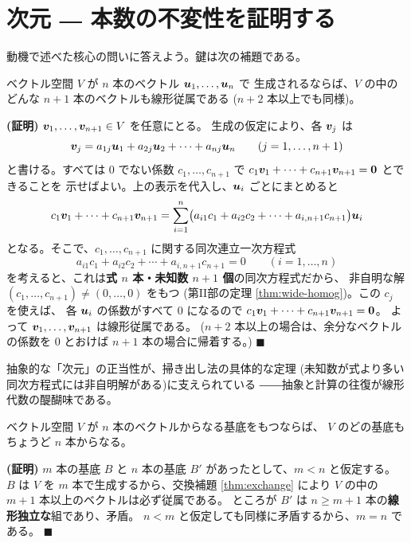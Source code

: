 \section{次元 ― 本数の不変性を証明する}

動機で述べた核心の問いに答えよう。鍵は次の補題である。

\begin{teiri}[交換補題]\label{thm:exchange}
ベクトル空間 $V$ が $n$ 本のベクトル $\bm{u}_1, \dots, \bm{u}_n$ で
生成されるならば、$V$ の中のどんな $n + 1$ 本のベクトルも線形従属である
($n + 2$ 本以上でも同様)。
\end{teiri}

\noindent\textbf{(証明)}\quad
$\bm{v}_1, \dots, \bm{v}_{n+1} \in V$ を任意にとる。
生成の仮定により、各 $\bm{v}_j$ は
\[
\bm{v}_j = a_{1j}\bm{u}_1 + a_{2j}\bm{u}_2 + \cdots + a_{nj}\bm{u}_n
\qquad (j = 1, \dots, n+1)
\]
と書ける。すべては $0$ でない係数 $c_1, \dots, c_{n+1}$ で
$c_1\bm{v}_1 + \cdots + c_{n+1}\bm{v}_{n+1} = \bm{0}$ とできることを
示せばよい。上の表示を代入し、$\bm{u}_i$ ごとにまとめると
\[
c_1\bm{v}_1 + \cdots + c_{n+1}\bm{v}_{n+1}
= \sum_{i=1}^{n} \bigl( a_{i1}c_1 + a_{i2}c_2 + \cdots + a_{i,n+1}c_{n+1} \bigr)
\bm{u}_i
\]
となる。そこで、$c_1, \dots, c_{n+1}$ に関する同次連立一次方程式
\[
a_{i1}c_1 + a_{i2}c_2 + \cdots + a_{i,n+1}c_{n+1} = 0
\qquad (i = 1, \dots, n)
\]
を考えると、これは\textbf{式 $n$ 本・未知数 $n + 1$ 個}の同次方程式だから、
非自明な解 $(c_1, \dots, c_{n+1}) \neq (0, \dots, 0)$ をもつ
(第II部の定理 \ref{thm:wide-homog})。この $c_j$ を使えば、
各 $\bm{u}_i$ の係数がすべて $0$ になるので
$c_1\bm{v}_1 + \cdots + c_{n+1}\bm{v}_{n+1} = \bm{0}$。
よって $\bm{v}_1, \dots, \bm{v}_{n+1}$ は線形従属である。
($n + 2$ 本以上の場合は、余分なベクトルの係数を $0$ とおけば
$n + 1$ 本の場合に帰着する。) $\blacksquare$

抽象的な「次元」の正当性が、掃き出し法の具体的な定理
(未知数が式より多い同次方程式には非自明解がある)に支えられている
――抽象と計算の往復が線形代数の醍醐味である。

\begin{teiri}[基底の本数の不変性]\label{thm:dim-invariant}
ベクトル空間 $V$ が $n$ 本のベクトルからなる基底をもつならば、
$V$ のどの基底もちょうど $n$ 本からなる。
\end{teiri}

\noindent\textbf{(証明)}\quad
$m$ 本の基底 $B$ と $n$ 本の基底 $B'$ があったとして、$m < n$ と仮定する。
$B$ は $V$ を $m$ 本で生成するから、交換補題 \ref{thm:exchange} により
$V$ の中の $m + 1$ 本以上のベクトルは必ず従属である。
ところが $B'$ は $n \ge m + 1$ 本の\textbf{線形独立な}組であり、矛盾。
$n < m$ と仮定しても同様に矛盾するから、$m = n$ である。 $\blacksquare$

